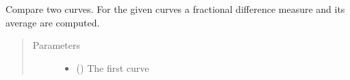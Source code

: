 \documentclass[letterpaper,10pt,english]{sphinxmanual}
\begin{document}
\begin{fulllineitems}
\label{\detokenize{pydv:pydvpy.diffMeasure}}
Compare two curves. For the given curves a fractional difference measure and its average are computed.

\begin{sphinxVerbatim}[commandchars=\\\{\}]
  
\end{sphinxVerbatim}

\begin{sphinxVerbatim}[commandchars=\\\{\}]
    \PYG{p}{[}\PYG{p}{]} \PYG{p}{[}\PYG{p}{]}
\end{sphinxVerbatim}

\begin{sphinxVerbatim}[commandchars=\\\{\}]
\end{sphinxVerbatim}

\begin{sphinxVerbatim}[commandchars=\\\{\}]
\end{sphinxVerbatim}

\begin{sphinxVerbatim}[commandchars=\\\{\}]
 
\end{sphinxVerbatim}
\begin{quote}\begin{description}
\item[{Parameters}] \leavevmode\begin{itemize}
\item {} 
 ({\hyperref[\detokenize{pydv:curve.Curve}]{}}) \textendash{} The first curve


\end{itemize}
\end{description}
\end{quote}
\end{fulllineitems}
\end{document}
